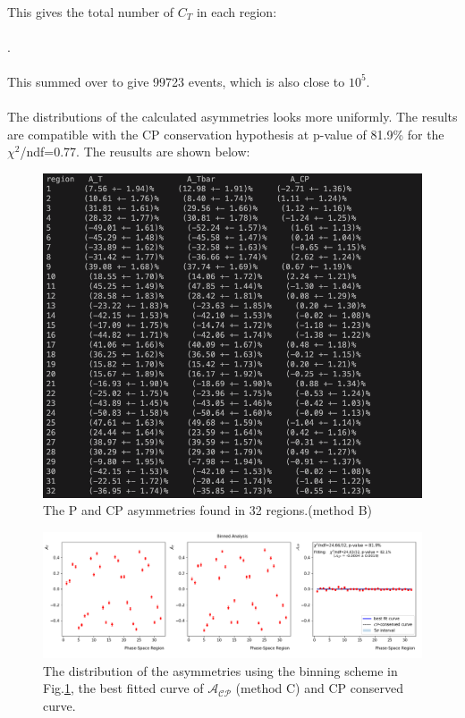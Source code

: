 \\
This gives the total number of $C_T$ in each region:
\\
\\
\seqsplit{$[1422, 1772, 2277, 1887, 746, 991, 1116, 981, 2098, 1988, 2608, 1768, 1086, 1017, 1307, 754, 2125, 2257, 1951, 1576, 1114, 1143, 1082, 727, 2158, 2187, 2318, 1839, 1178, 1017, 1239, 902, 1222, 1432, 1178, 1054, 2180, 2632, 2260, 1880, 919, 1366, 983, 982, 1743, 2499, 1846, 1979, 888, 1056, 1418, 1149, 1568, 1906, 2775, 2230, 766, 1328, 1018, 984, 1434, 2499, 1959, 1959]$}.
\\
\\
This summed over to give 99723 events, which is also close to $10^5$.
\\
\\
The distributions of the calculated asymmetries looks more uniformly. The results are compatible with the CP conservation hypothesis at p-value of 81.9\% for the $\chi^2$/ndf=0.77. The reusults are shown below:
\begin{figure}[h]
\center
\includegraphics*[width=0.76\linewidth]{binnedanalysis/phase_space_region_asy3}
\caption{The P and CP asymmetries found in 32 regions.(method B)}
\label{phase_space3}
\end{figure}
\begin{figure}[h]
\center
\includegraphics*[width=0.86\linewidth]{binnedanalysis/Binned_Analysis_factorspd_1E0.0_100000_3}
\caption{The distribution of the asymmetries using the binning scheme in Fig.\ref{phase_space3}, the best fitted curve of $\mathcal{A}_{\mathcal{C}\mathcal{P}}$ (method C) and CP conserved curve.}
\label{binning3}
\end{figure}

